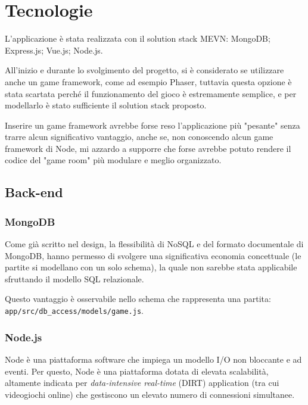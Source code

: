\section{Tecnologie}

L'applicazione è stata realizzata con il solution stack MEVN: MongoDB;
\newline
Express.js; Vue.js; Node.js.

All'inizio e durante lo svolgimento del progetto, si è considerato se utilizzare anche un game framework, come ad esempio Phaser, tuttavia questa opzione è stata scartata perché il funzionamento del gioco è estremamente semplice, e per modellarlo è stato sufficiente il solution stack proposto.

Inserire un game framework avrebbe forse reso l'applicazione più "pesante" senza trarre alcun significativo vantaggio, anche se, non conoscendo alcun game framework di Node, mi azzardo a supporre che forse avrebbe potuto rendere il codice del "game room" più modulare e meglio organizzato.

\subsection{Back-end}

\subsubsection{MongoDB}

Come già scritto nel design, la flessibilità di NoSQL e del formato documentale di MongoDB, hanno permesso di svolgere una significativa economia concettuale (le partite si modellano con un solo schema), la quale non sarebbe stata applicabile sfruttando il modello SQL relazionale.

Questo vantaggio è osservabile nello schema che rappresenta una partita: \texttt{app/src/db\_access/models/game.js}.

\subsubsection{Node.js}

Node è una piattaforma software che impiega un modello I/O non bloccante e ad eventi. Per questo, Node è una piattaforma dotata di elevata scalabilità, altamente indicata per \emph{data-intensive real-time} (DIRT) application (tra cui videogiochi online) che gestiscono un elevato numero di connessioni simultanee.

